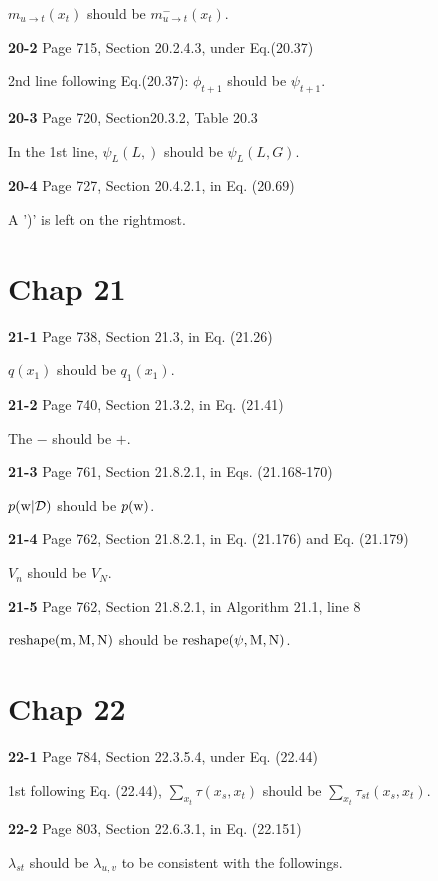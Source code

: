 \documentclass[aps,preprint,a4]{revtex4-1}
\begin{document}
$m_{u\rightarrow t}(x_{t})$ should be $m^{-}_{u\rightarrow t}(x_{t})$.

{\color{red}\textbf{20-2}} Page 715, Section 20.2.4.3, under Eq.(20.37)

2nd line following Eq.(20.37): $\phi_{t+1}$ should be $\psi_{t+1}$.

{\color{red}\textbf{20-3}} Page 720,  Section20.3.2, Table 20.3

In the 1st line, $\psi_{L}(L,)$ should be $\psi_{L}(L,G)$.

{\color{red}\textbf{20-4}} Page 727, Section 20.4.2.1, in Eq. (20.69)

A ')' is left on the rightmost.




\section{Chap 21}
{\color{red}\textbf{21-1}} Page 738, Section 21.3, in Eq. (21.26) 

$q(x_{1})$ should be $q_{1}(x_{1})$.

{\color{red}\textbf{21-2}} Page 740, Section 21.3.2, in Eq. (21.41)

The $-$ should be $+$.

{\color{red}\textbf{21-3}} Page 761, Section 21.8.2.1, in Eqs. (21.168-170)

$p(\rm w|\mathcal D)$ should be $p(\rm w)$.

{\color{red}\textbf{21-4}} Page 762, Section 21.8.2.1, in Eq. (21.176) and Eq. (21.179)

$V_{n}$ should be $V_{N}$.

{\color{red}\textbf{21-5}} Page 762, Section 21.8.2.1, in Algorithm 21.1, line 8

$\rm reshape(m,M,N)$ should be $\rm reshape(\psi,M,N)$.




\section{Chap 22}
{\color{red}\textbf{22-1}} Page 784, Section 22.3.5.4, under Eq. (22.44)

1st following Eq. (22.44), $\sum_{x_{t}}\tau(x_{s},x_{t})$ should be $\sum_{x_{t}}\tau_{st}(x_{s},x_{t})$.

{\color{red}\textbf{22-2}} Page 803, Section 22.6.3.1, in Eq. (22.151)

$\lambda_{st}$ should be $\lambda_{u,v}$ to be consistent with the followings.
\end{document}

